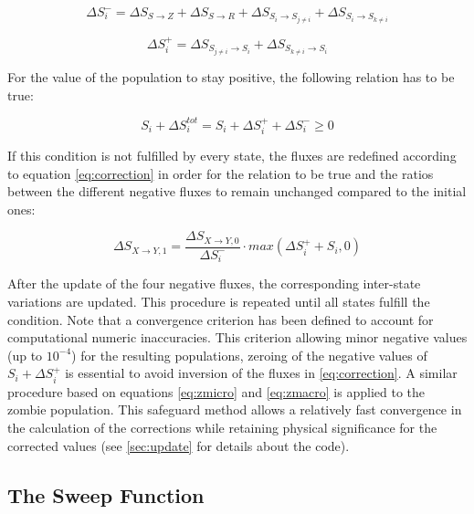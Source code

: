 \documentclass[11pt]{article} %
\begin{document}
\bigskip
\begin{equation} \label{eq:delta-}
\Delta S_i^- = \Delta S_{S\rightarrow Z} + \Delta S_{S\rightarrow R} + \Delta S_{S_i\rightarrow S_{j\neq i}} + \Delta S_{S_i\rightarrow S_{k\neq i}}
\end{equation}

\begin{equation} \label{eq:delta+}
\Delta S_i^+ = \Delta S_{S_{j\neq i}\rightarrow S_i} + \Delta S_{S_{k\neq i}\rightarrow S_i}
\end{equation}
\bigskip

For the value of the population to stay positive, the following relation has to be true:

\bigskip
\begin{equation} \label{eq:condition}
S_i + \Delta S_i^{tot} = S_i + \Delta S_i^+ + \Delta S_i^- \geq 0
\end{equation}
\bigskip

If this condition is not fulfilled by every state, the fluxes are redefined according to equation \eqref{eq:correction} in order for the relation to be true and the ratios between the different negative fluxes to remain unchanged compared to the initial ones:

\bigskip
\begin{equation} \label{eq:correction}
\Delta S_{X\rightarrow Y,1} = \frac{\Delta S_{X\rightarrow Y,0}}{\Delta S_i^-}\cdot max(\Delta S_i^+ + S_i, 0)
\end{equation}
\bigskip

After the update of the four negative fluxes, the corresponding inter-state variations are updated. This procedure is repeated until all states fulfill the condition. Note that a convergence criterion has been defined to account for computational numeric inaccuracies. This criterion allowing minor negative values (up to $10^{-4}$) for the resulting populations, zeroing of the negative values of $S_i + \Delta S_i^+$ is essential to avoid inversion of the fluxes in \eqref{eq:correction}. A similar procedure based on equations \eqref{eq:zmicro} and \eqref{eq:zmacro} is applied to the zombie population. This safeguard method allows a relatively fast convergence in the calculation of the corrections while retaining physical significance for the corrected values (see \ref{sec:update} for details about the code).



\subsection{The Sweep Function}\indent
\end{document}
